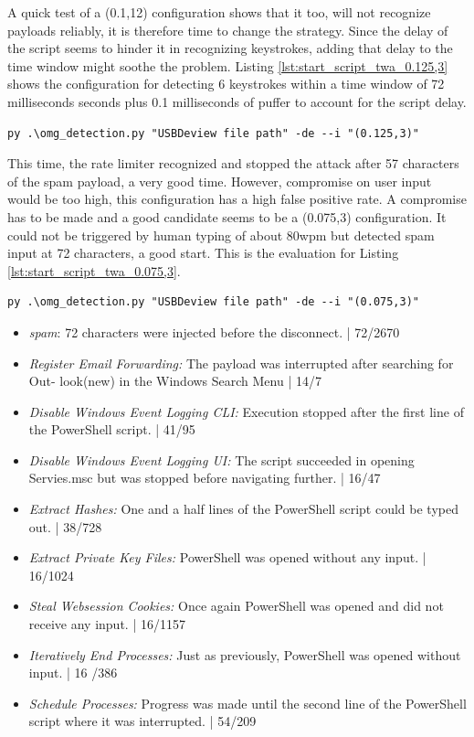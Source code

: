 A quick test of a (0.1,12) configuration shows that it too, will not recognize payloads reliably, it is therefore time to change the strategy.
Since the delay of the script seems to hinder it in recognizing keystrokes, adding that delay to the time window might soothe the problem. Listing \ref{lst:start_script_twa_0.125,3} shows the configuration for detecting 6 keystrokes within a time window of 72 milliseconds seconds plus 0.1 milliseconds of puffer to account for the script delay. 

\begin{lstlisting}[caption={start defence Script with TWA (0.125,3)},label={lst:start_script_twa_0.125,3}, captionpos=b]
 py .\omg_detection.py "USBDeview file path" -de --i "(0.125,3)"
\end{lstlisting}

This time, the rate limiter recognized and stopped the attack after 57 characters of the spam payload, a very good time. However, compromise on user input would be too high, this configuration has a high false positive rate. A compromise has to be made and a good candidate seems to be a (0.075,3) configuration. It could not be triggered by human typing of about 80wpm but detected spam input at 72 characters, a good start. This is the evaluation for Listing \ref{lst:start_script_twa_0.075,3}. 


\begin{lstlisting}[caption={start defence Script with TWA (0.075,3)},label={lst:start_script_twa_0.075,3}, captionpos=b]
 py .\omg_detection.py "USBDeview file path" -de --i "(0.075,3)"
\end{lstlisting}


\begin{itemize}
    \item  \emph{spam}: 72 characters were injected before the disconnect. | 72/2670
    \item  \emph{Register Email Forwarding:} The payload was interrupted after searching for Out-
look(new) in the Windows Search Menu | 14/7
    \item  \emph{Disable Windows Event Logging CLI:} Execution stopped after the first line of the
PowerShell script. | 41/95
    \item  \emph{Disable Windows Event Logging UI:} The script succeeded in opening Servies.msc
but was stopped before navigating further. | 16/47
    \item  \emph{Extract Hashes:}  One and a half lines of the PowerShell script could be typed out. | 38/728 
    \item  \emph{Extract Private Key Files:}  PowerShell was opened without any input. | 16/1024
    \item  \emph{Steal Websession Cookies:} Once again PowerShell was opened and did not receive any input. | 16/1157
    \item  \emph{Iteratively End Processes:} Just as previously, PowerShell was opened without input. | 16 /386
    \item  \emph{Schedule Processes:}  Progress was made until the second line of the PowerShell script where it was interrupted. | 54/209
\end{itemize}


